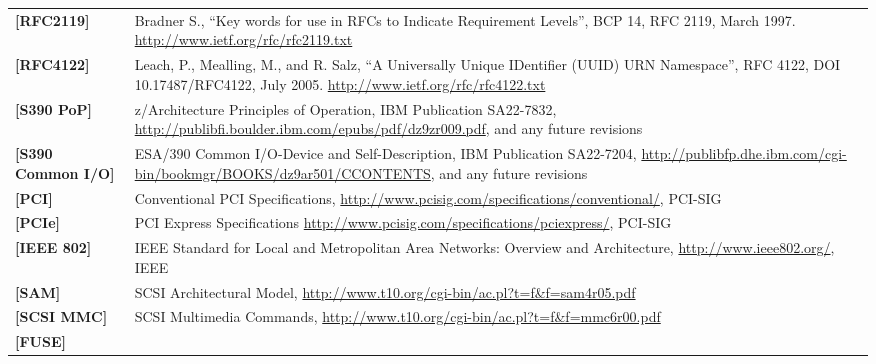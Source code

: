 \begin{longtable}{l p{5in}}
	\label{intro:rfc2119}\textbf{[RFC2119]} &
Bradner S., ``Key words for use in RFCs to Indicate Requirement
Levels'', BCP 14, RFC 2119, March 1997. \newline\url{http://www.ietf.org/rfc/rfc2119.txt}\\
	\label{intro:rfc4122}\textbf{[RFC4122]} &
Leach, P., Mealling, M., and R. Salz, ``A Universally Unique
IDentifier (UUID) URN Namespace'', RFC 4122, DOI 10.17487/RFC4122,
July 2005. \newline\url{http://www.ietf.org/rfc/rfc4122.txt}\\
	\label{intro:S390 PoP}\textbf{[S390 PoP]} & z/Architecture Principles of Operation, IBM Publication SA22-7832, \newline\url{http://publibfi.boulder.ibm.com/epubs/pdf/dz9zr009.pdf}, and any future revisions\\
	\label{intro:S390 Common I/O}\textbf{[S390 Common I/O]} & ESA/390 Common I/O-Device and Self-Description, IBM Publication SA22-7204, \newline\url{http://publibfp.dhe.ibm.com/cgi-bin/bookmgr/BOOKS/dz9ar501/CCONTENTS}, and any future revisions\\
	\label{intro:PCI}\textbf{[PCI]} &
	Conventional PCI Specifications,
	\newline\url{http://www.pcisig.com/specifications/conventional/},
	PCI-SIG\\
	\label{intro:PCIe}\textbf{[PCIe]} &
	PCI Express Specifications
	\newline\url{http://www.pcisig.com/specifications/pciexpress/},
	PCI-SIG\\
	\label{intro:IEEE 802}\textbf{[IEEE 802]} &
	IEEE Standard for Local and Metropolitan Area Networks: Overview and Architecture,
	\newline\url{http://www.ieee802.org/},
	IEEE\\
	\label{intro:SAM}\textbf{[SAM]} &
        SCSI Architectural Model,
        \newline\url{http://www.t10.org/cgi-bin/ac.pl?t=f&f=sam4r05.pdf}\\
	\label{intro:SCSI MMC}\textbf{[SCSI MMC]} &
        SCSI Multimedia Commands,
        \newline\url{http://www.t10.org/cgi-bin/ac.pl?t=f&f=mmc6r00.pdf}\\
	\label{intro:FUSE}\textbf{[FUSE]} &

\end{longtable}
